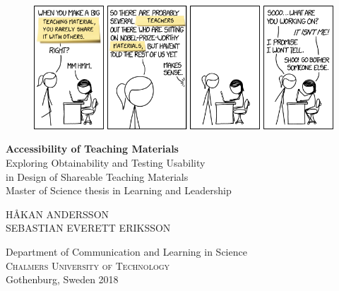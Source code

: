 
\begin{titlepage}
			
\addtolength{\voffset}{2cm}

\begin{figure}[H]
\centering
\vspace{2cm}	%
\includegraphics[width=0.8\linewidth]{figure/xkcd.png}
\end{figure}

\mbox{}
\vfill
\renewcommand{\familydefault}{\sfdefault} \normalfont %
\textbf{{\Huge Accessibility of Teaching Materials 	}} 	\\[0.5cm]
{\Large Exploring Obtainability and Testing Usability \\[0.1cm] in Design of Shareable Teaching Materials}\\[0.5cm]
Master of Science thesis in Learning and Leadership \setlength{\parskip}{1cm}

{\Large HÅKAN ANDERSSON \\[0.2cm] SEBASTIAN EVERETT ERIKSSON} \setlength{\parskip}{2.9cm}

Department of Communication and Learning in Science \\
\textsc{Chalmers University of Technology} \\
Gothenburg, Sweden 2018

\renewcommand{\familydefault}{\rmdefault} \normalfont %
\end{titlepage}


\newpage
\restoregeometry
\thispagestyle{empty}
\mbox{}


